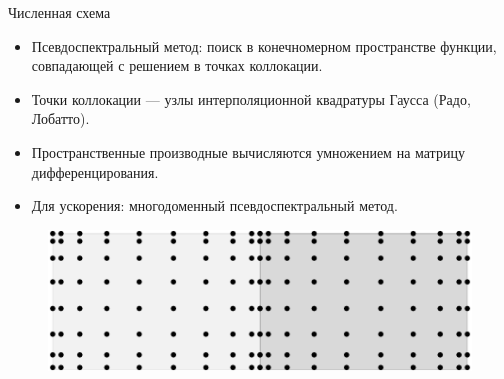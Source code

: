 \documentclass{beamer}
\newcommand{\vect}[1]{\underline{#1}}
\begin{document}
\begin{frame}{Численная схема}
\begin{itemize}
	\item Псевдоспектральный метод: поиск в конечномерном пространстве функции, совпадающей с решением в точках коллокации.
	\item Точки коллокации --- узлы интерполяционной квадратуры Гаусса (Радо, Лобатто).
	\item Пространственные производные вычисляются умножением на матрицу дифференцирования.
	\item Для ускорения: многодоменный псевдоспектральный метод.
\end{itemize}
\begin{figure}[h!]
	\centering
	\centering
	\includegraphics[width=.4\textwidth]{figures/Grid2D}
\end{figure}
\end{frame}
\end{document}
